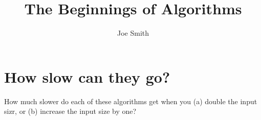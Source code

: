 \documentclass[10pt,reqno,sumlimits]{amsart}
\theoremstyle{plain}
\theoremstyle{definition}
\newcommand{\1}{{\bf 1}}
\numberwithin{equation}{section}
\begin{document}
\title[Assignment 1]{The Beginnings of Algorithms}
\author{Joe Smith}



\maketitle



\section {How slow can they go?}
How much slower do each of these algorithms get when you (a) double the input sizr, or (b) increase the input size by one?
\end{document}

